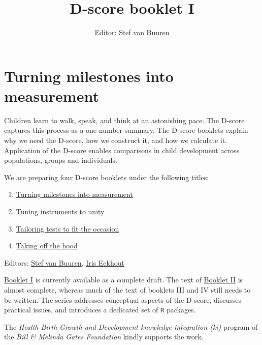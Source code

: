 \documentclass[
]{book}
\title{D-score booklet I}
\author{Editor: Stef van Buuren}
\date{}
\providecommand{\tightlist}{%
  \setlength{\itemsep}{0pt}\setlength{\parskip}{0pt}}
\begin{document}
\maketitle

{
\setcounter{tocdepth}{1}
\tableofcontents
}
\hypertarget{turning-milestones-into-measurement}{%
\chapter*{Turning milestones into measurement}\label{turning-milestones-into-measurement}}

Children learn to walk, speak, and think at an astonishing pace. The D-score captures this process as a one-number summary. The D-score booklets explain why we need the D-score, how we construct it, and how we calculate it. Application of the D-score enables comparisons in child development across populations, groups and individuals.

We are preparing four D-score booklets under the following titles:

\begin{enumerate}
\def\labelenumi{\Roman{enumi}.}
\tightlist
\item
  \href{https://d-score.org/dbook1}{Turning milestones into measurement}
\item
  \href{https://stefvanbuuren.name/dbook2}{Tuning instruments to unity}
\item
  \href{https://stefvanbuuren.name/dbook3}{Tailoring tests to fit the occasion}
\item
  \href{https://stefvanbuuren.name/dbook4}{Taking off the hood}
\end{enumerate}

Editors: \href{https://stefvanbuuren.name}{Stef van Buuren}, \href{https://www.iriseekhout.com}{Iris Eekhout}

\href{https://d-score.org/dbook1}{Booklet I} is currently available as a complete draft. The text of \href{https://stefvanbuuren.name/dbook2}{Booklet II} is almost complete, whereas much of the text of booklets III and IV still needs to be written. The series addresses conceptual aspects of the D-score, discusses practical issues, and introduces a dedicated set of \texttt{R} packages.

The \emph{Health Birth Growth and Development knowledge integration (ki)} program of the \emph{Bill \& Melinda Gates Foundation} kindly supports the work.
\end{document}
